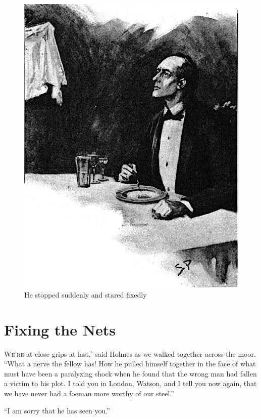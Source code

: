 \documentclass[paper=5.5in:8.5in,BCOR=7mm,twoside,DIV=calc,12pt,usegeometry,openany,chapterprefix,endperiod,headings=big]{scrbook} %
\begin{document}
\clearpage
\vfill
\begin{figure}[tbph]
\centering
\includegraphics[width=\linewidth]{13_stopstare}
\caption{He stopped suddenly and stared fixedly}
\end{figure}
\vfill
\thispagestyle{empty}
\clearpage

\chapter{Fixing the Nets}

\lettrine[ante=`,lines=1]{W}{e're} at close grips at last,' said Holmes as we walked together across the moor. \enquote{What a nerve the fellow has! How he pulled himself together in the face of what must have been a paralyzing shock when he found that the wrong man had fallen a victim to his plot. I told you in London, Watson, and I tell you now again, that we have never had a foeman more worthy of our steel.}

\enquote{I am sorry that he has seen you.}
\end{document}
